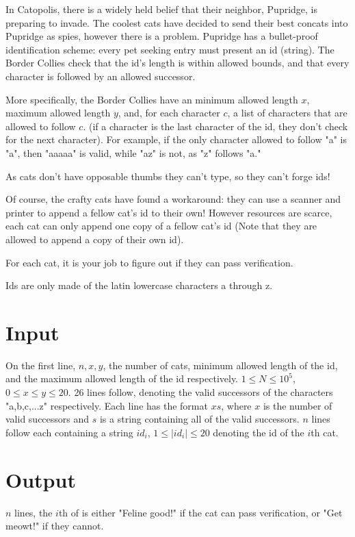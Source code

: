 
In Catopolis, there is a widely held belief that their neighbor, Pupridge, is preparing to invade. The coolest cats have decided to send their best concats into Pupridge as spies, however there is a problem. Pupridge has a bullet-proof identification scheme: every pet seeking entry must present an id (string). The Border Collies check that the id's length is within allowed bounds, and that every character is followed by an allowed successor. 

More specifically, the Border Collies have an minimum allowed length $x$, maximum allowed length $y$, and, for each character $c$, a list of characters that are allowed to follow $c$. (if a character is the last character of the id, they don't check for the next character). For example, if the only character allowed to follow "a" is "a", then "aaaaa" is valid, while "az" is not, as "z" follows "a."

As cats don't have opposable thumbs they can't type, so they can't forge ids!

\medskip

Of course, the crafty cats have found a workaround: they can use a scanner and printer to append a fellow cat's id to their own! However resources are scarce, each cat can only append one copy of a fellow cat's id (Note that they are allowed to append a copy of their own id).

\medskip

For each cat, it is your job to figure out if they can pass verification.

Ids are only made of the latin lowercase characters a through z.

\section*{Input}
On the first line, $n, x, y$, the number of cats, minimum allowed length of the id, and the maximum allowed length of the id respectively. $1 \leq N \leq 10^5$, $0 \leq x \leq y \leq 20$.
26 lines follow, denoting the valid successors of the characters "a,b,c,...z" respectively. Each line has the format $x s$, where $x$ is the number of valid successors and $s$ is a string containing all of the valid successors.
$n$ lines follow each containing a string $id_i$, $1 \leq |id_i| \leq 20$ denoting the id of the $i$th cat.

\section*{Output}
$n$ lines, the $i$th of is either "Feline good!" if the cat can pass verification, or "Get meowt!" if they cannot.

